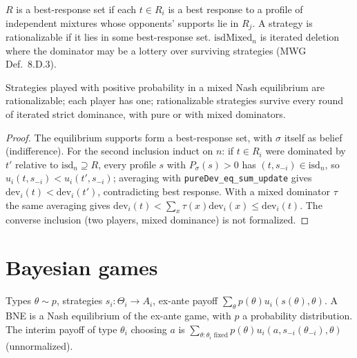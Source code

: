 \begin{definition}
\label{def:rationalizable}
\leanok
{}
$R$ is a best-response set if each $t \in R_i$ is a best response to a profile of independent mixtures whose
opponents' supports lie in $R_j$. A strategy is rationalizable if it lies in some best-response set.
$\mathrm{isdMixed}_n$ is iterated deletion where the dominator may be a lottery over surviving strategies
(MWG Def.~8.D.3).
\end{definition}

\begin{theorem}
\label{thm:rationalizable}
\leanok
{}
Strategies played with positive probability in a mixed Nash equilibrium are rationalizable; each player has one;
rationalizable strategies survive every round of iterated strict dominance, with pure or with mixed
dominators.
\end{theorem}
\begin{proof}
\leanok
The equilibrium supports form a best-response set, with $\sigma$ itself as belief (indifference). For the second
inclusion induct on $n$: if $t \in R_i$ were dominated by $t'$ relative to $\mathrm{isd}_n \supseteq R$, every
profile $s$ with $P_\sigma(s) > 0$ has $(t, s_{-i}) \in \mathrm{isd}_n$, so $u_i(t, s_{-i}) < u_i(t', s_{-i})$;
averaging with \texttt{pureDev\_eq\_sum\_update} gives $\mathrm{dev}_i(t) < \mathrm{dev}_i(t')$, contradicting
best response. With a mixed dominator $\tau$ the same averaging gives
$\mathrm{dev}_i(t) < \sum_x \tau(x)\mathrm{dev}_i(x) \le \mathrm{dev}_i(t)$. The converse inclusion (two players,
mixed dominance) is not formalized.
\end{proof}

\section{Bayesian games}
\label{sec:bayesian}

\begin{definition}
\label{def:bne}
\leanok
{}
Types $\theta \sim p$, strategies $s_i : \Theta_i \to A_i$, ex-ante payoff $\sum_\theta p(\theta) u_i(s(\theta), \theta)$.
A BNE is a Nash equilibrium of the ex-ante game, with $p$ a probability distribution. The interim payoff of type $\theta_i$ choosing $a$ is
$\sum_{\theta : \theta_i \text{ fixed}} p(\theta) u_i(a, s_{-i}(\theta_{-i}), \theta)$ (unnormalized).
\end{definition}

